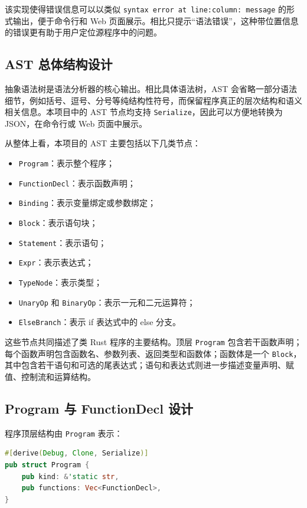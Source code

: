 \documentclass[UTF8,a4paper,12pt]{ctexart}
\begin{document}
该实现使得错误信息可以以类似 \texttt{syntax error at line:column: message} 的形式输出，便于命令行和 Web 页面展示。相比只提示“语法错误”，这种带位置信息的错误更有助于用户定位源程序中的问题。

\subsection{AST 总体结构设计}

抽象语法树是语法分析器的核心输出。相比具体语法树，AST 会省略一部分语法细节，例如括号、逗号、分号等纯结构性符号，而保留程序真正的层次结构和语义相关信息。本项目中的 AST 节点均支持 \texttt{Serialize}，因此可以方便地转换为 JSON，在命令行或 Web 页面中展示。

从整体上看，本项目的 AST 主要包括以下几类节点：

\begin{itemize}
    \item \texttt{Program}：表示整个程序；
    \item \texttt{FunctionDecl}：表示函数声明；
    \item \texttt{Binding}：表示变量绑定或参数绑定；
    \item \texttt{Block}：表示语句块；
    \item \texttt{Statement}：表示语句；
    \item \texttt{Expr}：表示表达式；
    \item \texttt{TypeNode}：表示类型；
    \item \texttt{UnaryOp} 和 \texttt{BinaryOp}：表示一元和二元运算符；
    \item \texttt{ElseBranch}：表示 if 表达式中的 else 分支。
\end{itemize}

这些节点共同描述了类 Rust 程序的主要结构。顶层 \texttt{Program} 包含若干函数声明；每个函数声明包含函数名、参数列表、返回类型和函数体；函数体是一个 \texttt{Block}，其中包含若干语句和可选的尾表达式；语句和表达式则进一步描述变量声明、赋值、控制流和运算结构。

\subsection{Program 与 FunctionDecl 设计}

程序顶层结构由 \texttt{Program} 表示：

\begin{lstlisting}[language=Rust,caption={Program 节点定义}]
#[derive(Debug, Clone, Serialize)]
pub struct Program {
    pub kind: &'static str,
    pub functions: Vec<FunctionDecl>,
}
\end{lstlisting}
\end{document}
